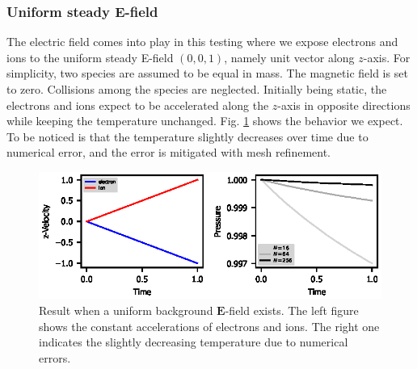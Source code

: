 \documentclass{report}
\begin{document}
\subsubsection{Uniform steady E-field}
The electric field comes into play in this testing where we expose electrons and ions to the uniform steady E-field $(0,0,1)$, namely unit vector along $z$-axis. For simplicity, two species are assumed to be equal in mass. The magnetic field is set to zero. Collisions among the species are neglected. Initially being static, the electrons and ions expect to be accelerated along the $z$-axis in opposite directions while keeping the temperature unchanged. Fig. \ref{fig:uniform_e_test} shows the behavior we expect. To be noticed is that the temperature slightly decreases over time due to numerical error, and the error is mitigated with mesh refinement.
\begin{figure}
    \centering
    \includegraphics{uniform_E_test.eps}
    \caption{Result when a uniform background $\mathbf{E}$-field exists. The left figure shows the constant accelerations of electrons and ions. The right one indicates the slightly decreasing temperature due to numerical errors.}
    \label{fig:uniform_e_test}
\end{figure}
\end{document}
